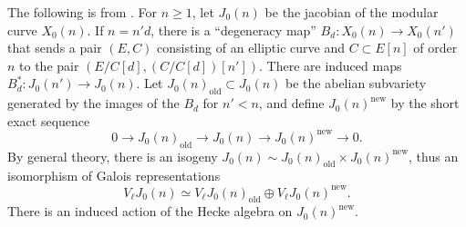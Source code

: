 \documentclass{article}
\begin{document}
The following is from \cite[\S 2]{mazur-1978}. 
For $n\geqslant 1$, let $J_0(n)$ be the jacobian of the modular curve $X_0(n)$. 
If $n=n' d$, there is a ``degeneracy map'' $B_d:X_0(n)\to X_0(n')$ that sends a 
pair $(E,C)$ consisting of an elliptic curve and $C\subset E[n]$ of order $n$ 
to the pair $(E/C[d],(C/C[d])[n'])$. There are induced maps 
$B_d^\ast:J_0(n')\to J_0(n)$. Let $J_0(n)_\mathrm{old}\subset J_0(n)$ be the 
abelian subvariety generated by the images of the $B_d$ for $n'<n$, and define 
$J_0(n)^\mathrm{new}$ by the short exact sequence 
\[
  0 \to J_0(n)_\mathrm{old} \to J_0(n) \to J_0(n)^\mathrm{new} \to 0 .
\]
By general theory, there is an isogeny 
$J_0(n)\sim J_0(n)_\mathrm{old}\times J_0(n)^\mathrm{new}$, thus an isomorphism 
of Galois representations 
\[
  V_\ell J_0(n) \simeq V_\ell J_0(n)_\mathrm{old}\oplus V_\ell J_0(n)^\mathrm{new} .
\]
There is an induced action of the Hecke algebra on $J_0(n)^\mathrm{new}$. 







\end{document}
